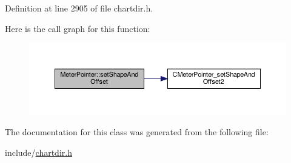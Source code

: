 Definition at line 2905 of file chartdir.\+h.

Here is the call graph for this function\+:
\nopagebreak
\begin{figure}[H]
\begin{center}
\leavevmode
\includegraphics[width=350pt]{class_meter_pointer_a1fe290c1ac81816a5a1d06673fb414d5_cgraph}
\end{center}
\end{figure}


The documentation for this class was generated from the following file\+:\begin{DoxyCompactItemize}
\item 
include/\hyperlink{chartdir_8h}{chartdir.\+h}\end{DoxyCompactItemize}
